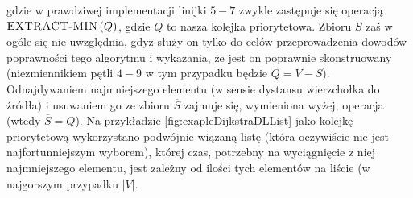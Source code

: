 gdzie w prawdziwej implementacji linijki $5-7$ zwykle zastępuje się operacją $\textrm{\textsc{EXTRACT-MIN}} \left( Q \right)$, gdzie $Q$ to nasza kolejka priorytetowa. Zbioru $S$ zaś w ogóle się nie uwzględnia, gdyż służy on tylko do celów przeprowadzenia dowodów poprawności tego algorytmu i wykazania, że jest on poprawnie skonstruowany (niezmiennikiem pętli $4-9$ w tym przypadku będzie $Q = V - S$). Odnajdywaniem najmniejszego elementu (w sensie dystansu wierzchołka do źródła) i usuwaniem go ze zbioru $\overline{S}$ zajmuje się, wymieniona wyżej, operacja (wtedy $\overline{S} = Q$). Na przykładzie \ref{fig:exapleDijkstraDLList} jako kolejkę priorytetową wykorzystano podwójnie wiązaną listę (która oczywiście nie jest najfortunniejszym wyborem), której czas, potrzebny na wyciągnięcie z niej najmniejszego elementu, jest zależny od ilości tych elementów na liście (w najgorszym przypadku $ \left| V \right| $.

